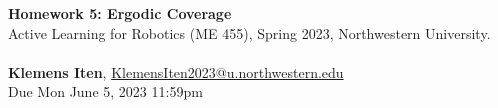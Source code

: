 \documentclass[letterpaper, 12pt]{article}
\begin{document}

\large\textbf{Homework 5: Ergodic Coverage} \\  
\normalsize Active Learning for Robotics (ME 455), Spring 2023, Northwestern University.
\\ \\
\normalsize\textbf{Klemens Iten}, \href{mailto:KlemensIten2023@u.northwestern.edu}{KlemensIten2023@u.northwestern.edu}\\
\normalsize   Due Mon June 5, 2023 11:59pm


\clearpage

% 
% 
\end{document}
